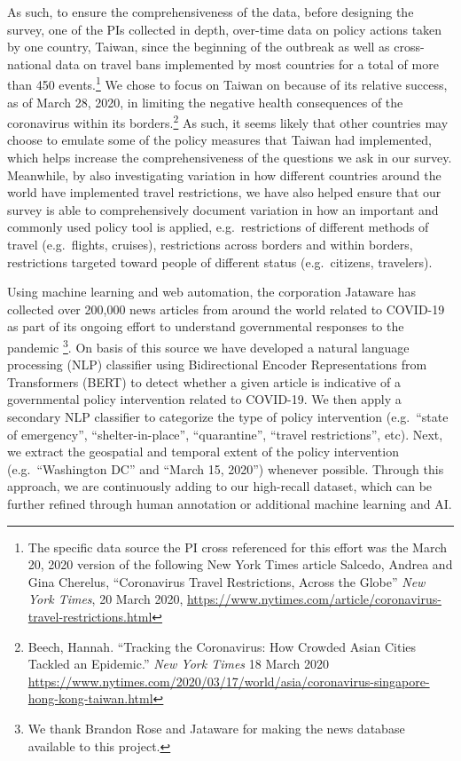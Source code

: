 \documentclass[]{article}
\let\rmarkdownfootnote\footnote%
\def\footnote{\protect\rmarkdownfootnote}
\begin{document}
As such, to ensure the comprehensiveness of the data, before designing the survey, one of the PIs collected in depth, over-time data on policy actions taken by one country, Taiwan, since the beginning of the outbreak as well as cross-national data on travel bans implemented by most countries for a total of more than 450 events.\footnote{The specific data source the PI cross referenced for this effort was the March 20, 2020 version of the following New York Times article Salcedo, Andrea and Gina Cherelus, ``Coronavirus Travel Restrictions, Across the Globe'' \emph{New York Times}, 20 March 2020, \url{https://www.nytimes.com/article/coronavirus-travel-restrictions.html}} We chose to focus on Taiwan on because of its relative success, as of March 28, 2020, in limiting the negative health consequences of the coronavirus within its borders.\footnote{Beech, Hannah. ``Tracking the Coronavirus: How Crowded Asian Cities Tackled an Epidemic.'' \emph{New York Times} 18 March 2020 \url{https://www.nytimes.com/2020/03/17/world/asia/coronavirus-singapore-hong-kong-taiwan.html}} As such, it seems likely that other countries may choose to emulate some of the policy measures that Taiwan had implemented, which helps increase the comprehensiveness of the questions we ask in our survey. Meanwhile, by also investigating variation in how different countries around the world have implemented travel restrictions, we have also helped ensure that our survey is able to comprehensively document variation in how an important and commonly used policy tool is applied, e.g.~restrictions of different methods of travel (e.g.~flights, cruises), restrictions across borders and within borders, restrictions targeted toward people of different status (e.g.~citizens, travelers).

Using machine learning and web automation, the corporation Jataware has collected over 200,000 news articles from around the world related to COVID-19 as part of its ongoing effort to understand governmental responses to the pandemic \footnote{We thank Brandon Rose and Jataware for making the news database available to this project.}. On basis of this source we have developed a natural language processing (NLP) classifier using Bidirectional Encoder Representations from Transformers (BERT) to detect whether a given article is indicative of a governmental policy intervention related to COVID-19. We then apply a secondary NLP classifier to categorize the type of policy intervention (e.g.~``state of emergency'', ``shelter-in-place'', ``quarantine'', ``travel restrictions'', etc). Next, we extract the geospatial and temporal extent of the policy intervention (e.g.~``Washington DC'' and ``March 15, 2020'') whenever possible. Through this approach, we are continuously adding to our high-recall dataset, which can be further refined through human annotation or additional machine learning and AI.
\end{document}
